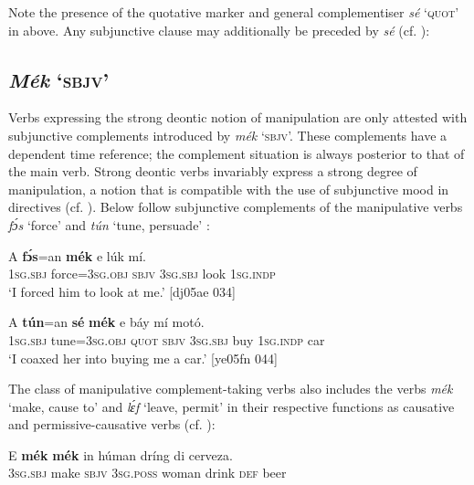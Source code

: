 Note the presence of the quotative marker and general complementiser \textit{sé} ‘\textsc{quot}’ in  above. Any subjunctive clause may additionally be preceded by \textit{sé} (cf. ):

\subsection{\textit{Mék} ‘\textsc{sbjv}’} \label{sec:10.5.5}

Verbs expressing the strong deontic notion of manipulation are only attested with subjunctive complements introduced by \textit{mék} ‘\textsc{sbjv}’. These complements have a dependent time reference; the complement situation is always posterior to that of the main verb. Strong deontic verbs invariably express a strong degree of manipulation, a notion that is compatible with the use of subjunctive mood in directives (cf. ). Below follow subjunctive complements of the manipulative verbs \textit{fɔ́s} ‘force’  and \textit{tún} ‘tune, persuade’ :


\ea%
    \label{ex:key:1397}
    \gll \MakeUppercase{A}   \textbf{fɔ́s}=an    \textbf{mék}    e    lúk    mí.\\
\textsc{1sg.sbj}  force=\textsc{3sg.obj}  \textsc{sbjv}    \textsc{3sg.sbj}  look    \textsc{1sg.indp}\\

\glt ‘I forced him to look at me.’ [dj05ae 034]
\z


\ea%
    \label{ex:key:1398}
    \gll \MakeUppercase{A}   \textbf{tún}=an    \textbf{sé}    \textbf{mék}   e    báy    mí    motó.\\
\textsc{1sg.sbj}  tune=\textsc{3sg.obj}  \textsc{quot}    \textsc{sbjv}    \textsc{3sg.sbj}  buy    \textsc{1sg.indp}  car\\

\glt ‘I coaxed her into buying me a car.’ [ye05fn 044]
\z

The class of manipulative complement-taking verbs also includes the verbs \textit{mék} ‘make, cause to’  and \textit{lɛ́f} ‘leave, permit’ in their respective functions as causative and permissive-causative verbs (cf. ):{\fff}


\ea%
    \label{ex:key:1399}
    \gll E    \textbf{mék}    \textbf{mék}    in    húman  dríng  di  cerveza.\\
\textsc{3sg.sbj}  make  \textsc{sbjv}    \textsc{3sg.poss}  woman  drink  \textsc{def}  beer\\

